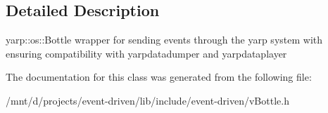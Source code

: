 \subsection{Detailed Description}
yarp\+::os\+::\+Bottle wrapper for sending events through the yarp system with ensuring compatibility with yarpdatadumper and yarpdataplayer 

The documentation for this class was generated from the following file\+:\begin{DoxyCompactItemize}
\item 
/mnt/d/projects/event-\/driven/lib/include/event-\/driven/v\+Bottle.\+h\end{DoxyCompactItemize}
